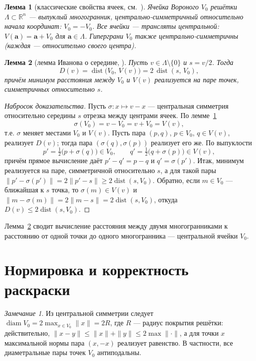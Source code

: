 \documentclass[12pt]{article}
\theoremstyle{plain}
\newtheorem{lemma}{Лемма}
\theoremstyle{definition}
\theoremstyle{remark}
\newtheorem{remark}{Замечание}
\newcommand{\RR}{\mathbb{R}}
\DeclareMathOperator{\diam}{diam}
\DeclareMathOperator{\dist}{dist}
\begin{document}
\begin{lemma}[классические свойства ячеек, см.~\cite{Voronoi1952}]
\label{lem:sym}
Ячейка Вороного $V_0$ решётки $\Lambda\subset\RR^n$ --- выпуклый многогранник,
центрально-симметричный относительно начала координат: $V_0=-V_0$. Все ячейки
--- трансляты центральной: $V(\mathbf{a})=\mathbf{a}+V_0$ для
$\mathbf{a}\in\Lambda$. Гиперграни $V_0$ также центрально-симметричны
(каждая --- относительно своего центра).
\end{lemma}

\begin{lemma}[лемма Иванова о середине, \cite{Ivanov2011}]
\label{lem:midpoint}
Пусть $v\in\Lambda\setminus\{0\}$ и $s=v/2$. Тогда
\[
D(v)=\dist\bigl(V_0,\,V(v)\bigr)=2\,\dist(s,\,V_0),
\]
причём минимум расстояния между $V_0$ и $V(v)$ реализуется на паре точек,
симметричных относительно $s$.
\end{lemma}

\begin{proof}[Набросок доказательства]
Пусть $\sigma\colon x\mapsto v-x$ --- центральная симметрия относительно
середины $s$ отрезка между центрами ячеек. По лемме~\ref{lem:sym}
\[
\sigma(V_0)=v-V_0=v+V_0=V(v),
\]
т.е. $\sigma$ меняет местами $V_0$ и $V(v)$. Пусть пара $(p,q)$, $p\in V_0$,
$q\in V(v)$, реализует $D(v)$; тогда пара $(\sigma(q),\sigma(p))$ реализует его
же. По выпуклости
\[
p'=\tfrac12\bigl(p+\sigma(q)\bigr)\in V_0,\qquad
q'=\tfrac12\bigl(q+\sigma(p)\bigr)\in V(v),
\]
причём прямое вычисление даёт $p'-q'=p-q$ и $q'=\sigma(p')$. Итак, минимум
реализуется на паре, симметричной относительно $s$, а для такой пары
$\|p'-\sigma(p')\|=2\|p'-s\|\ge 2\dist(s,V_0)$. Обратно, если $m\in V_0$ ---
ближайшая к $s$ точка, то $\sigma(m)\in V(v)$ и
$\|m-\sigma(m)\|=2\|m-s\|=2\dist(s,V_0)$, откуда $D(v)\le 2\dist(s,V_0)$.
\end{proof}

Лемма~\ref{lem:midpoint} сводит вычисление расстояния между двумя
многогранниками к расстоянию от одной точки до одного многогранника ---
центральной ячейки $V_0$.

\section{Нормировка и корректность раскраски}

\begin{remark}\label{rem:diam}
Из центральной симметрии следует
$\diam V_0 = 2\max_{x\in V_0}\|x\| = 2R$, где $R$ --- радиус покрытия решётки:
действительно, $\|x-y\|\le\|x\|+\|y\|\le 2\max\|\cdot\|$, а для точки $x$
максимальной нормы пара $(x,-x)$ реализует равенство. В частности, все
диаметральные пары точек $V_0$ антиподальны.
\end{remark}
\end{document}
